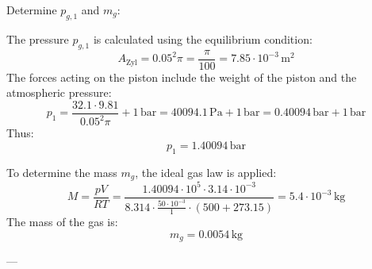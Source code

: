 Determine \( p_{g,1} \) and \( m_g \):  

The pressure \( p_{g,1} \) is calculated using the equilibrium condition:  
\[
A_{\text{Zyl}} = 0.05^2 \pi = \frac{\pi}{100} = 7.85 \cdot 10^{-3} \, \text{m}^2
\]  
The forces acting on the piston include the weight of the piston and the atmospheric pressure:  
\[
p_1 = \frac{32.1 \cdot 9.81}{0.05^2 \pi} + 1 \, \text{bar} = 40094.1 \, \text{Pa} + 1 \, \text{bar} = 0.40094 \, \text{bar} + 1 \, \text{bar}
\]  
Thus:  
\[
p_1 = 1.40094 \, \text{bar}
\]  

To determine the mass \( m_g \), the ideal gas law is applied:  
\[
M = \frac{p V}{R T} = \frac{1.40094 \cdot 10^5 \cdot 3.14 \cdot 10^{-3}}{8.314 \cdot \frac{50 \cdot 10^{-3}}{1} \cdot (500 + 273.15)} = 5.4 \cdot 10^{-3} \, \text{kg}
\]  
The mass of the gas is:  
\[
m_g = 0.0054 \, \text{kg}
\]  

---